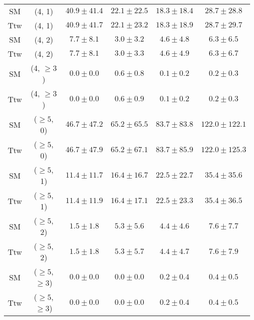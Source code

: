 \begin{table}[h!]
{\begin{tabular}{cccccc}
	SM & (4, 1) & $40.9\pm 41.4$ & $22.1\pm 22.5$ & $18.3\pm 18.4$ & $28.7\pm 28.8$ \\[0.5ex] 
	Ttw & (4, 1) & $40.9\pm 41.7$ & $22.1\pm 23.2$ & $18.3\pm 18.9$ & $28.7\pm 29.7$ \\[0.5ex] 
	SM & (4, 2) & $7.7\pm 8.1$ & $3.0\pm 3.2$ & $4.6\pm 4.8$ & $6.3\pm 6.5$ \\[0.5ex] 
	Ttw & (4, 2) & $7.7\pm 8.1$ & $3.0\pm 3.3$ & $4.6\pm 4.9$ & $6.3\pm 6.7$ \\[0.5ex] 
	SM & (4, $\ge3$) & $0.0\pm 0.0$ & $0.6\pm 0.8$ & $0.1\pm 0.2$ & $0.2\pm 0.3$ \\[0.5ex] 
	Ttw & (4, $\ge3$) & $0.0\pm 0.0$ & $0.6\pm 0.9$ & $0.1\pm 0.2$ & $0.2\pm 0.3$ \\[0.5ex] 
	SM & ($\ge5$, 0) & $46.7\pm 47.2$ & $65.2\pm 65.5$ & $83.7\pm 83.8$ & $122.0\pm 122.1$ \\[0.5ex] 
	Ttw & ($\ge5$, 0) & $46.7\pm 47.9$ & $65.2\pm 67.1$ & $83.7\pm 85.9$ & $122.0\pm 125.3$ \\[0.5ex] 
	SM & ($\ge5$, 1) & $11.4\pm 11.7$ & $16.4\pm 16.7$ & $22.5\pm 22.7$ & $35.4\pm 35.6$ \\[0.5ex] 
	Ttw & ($\ge5$, 1) & $11.4\pm 11.9$ & $16.4\pm 17.1$ & $22.5\pm 23.3$ & $35.4\pm 36.5$ \\[0.5ex] 
	SM & ($\ge5$, 2) & $1.5\pm 1.8$ & $5.3\pm 5.6$ & $4.4\pm 4.6$ & $7.6\pm 7.7$ \\[0.5ex] 
	Ttw & ($\ge5$, 2) & $1.5\pm 1.8$ & $5.3\pm 5.7$ & $4.4\pm 4.7$ & $7.6\pm 7.9$ \\[0.5ex] 
	SM & ($\ge5$, $\ge3$) & $0.0\pm 0.0$ & $0.0\pm 0.0$ & $0.2\pm 0.4$ & $0.4\pm 0.5$ \\[0.5ex] 
	Ttw & ($\ge5$, $\ge3$) & $0.0\pm 0.0$ & $0.0\pm 0.0$ & $0.2\pm 0.4$ & $0.4\pm 0.5$ \\[0.5ex] 
	\hline
	\hline
\end{tabular}}
\end{table}
